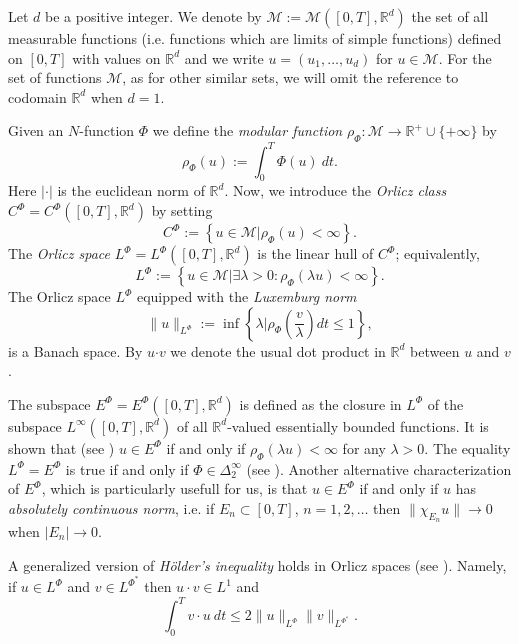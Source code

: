 \documentclass[twoside]{article}
\theoremstyle{remark}
\newcommand{\orlnor}{\|_{L^{\Phi}}}
\newcommand{\lphi}{L^{\Phi}}
\newcommand{\lpsi}{L^{\Phi^*}}
\newcommand{\ephi}{E^{\Phi}}
\newcommand{\claseor}{C^{\Phi}}
\renewcommand{\b}[1]{\boldsymbol{#1}}
\newcommand{\rr}{\mathbb{R}}
\renewcommand{\leq}{\leqslant}
\newcommand{\Phie}{\Phi^{*}}
\begin{document}
Let $d$ be a positive integer. We denote by $\mathcal{M}:=\mathcal{M}([0,T],\rr^d)$  the set of all measurable functions (i.e. functions which are limits of simple functions)  defined on $[0,T]$ with values on $\mathbb{R}^d$ and  we write $u=(u_1,\dots,u_d)$ for  $u\in \mathcal{M}$. For the set of functions $\mathcal{M}$, as for other similar sets, we will omit the reference to codomain $\mathbb{R}^d$ when $d=1$.


Given  an $N$-function $\Phi$ we define the \emph{modular function} 
$\rho_{\Phi}:\mathcal{M}\to \mathbb{R}^+\cup\{+\infty\}$ by
\[\rho_{\Phi}(u):= \int_0^T \Phi(u)\ dt.\]
Here $|\cdot|$ is the euclidean norm of $\mathbb{R}^d$.
Now, we introduce the \emph{Orlicz class} $C^{\Phi}=C^{\Phi}([0,T],\rr^d)$   by setting
\begin{equation}\label{claseOrlicz}
  C^{\Phi}:=\left\{u\in \mathcal{M} | \rho_{\Phi}(u)< \infty \right\}.
\end{equation}
The \emph{Orlicz space} $\lphi=L^{\Phi}([0,T],\rr^d)$ is the linear hull of $\claseor$;
equivalently,
\begin{equation}\label{espacioOrlicz}
\lphi:=\left\{ u\in \mathcal{M}| \exists \lambda>0: \rho_{\Phi}(\lambda u) < \infty   \right\}.
\end{equation}
  The Orlicz space $\lphi$ equipped with the \emph{Luxemburg norm}
\[
\|  u  \orlnor:=\inf \left\{ \lambda\bigg| \rho_{\Phi}\left(\frac{v}{\lambda}\right) dt\leq 1\right\},
\]
is a Banach space. By $u\b{\cdot} v$ we denote the usual dot product in $\mathbb{R}^{d}$ between $u$ and $v$.


The subspace $\ephi=\ephi([0,T],\rr^d)$ is defined as the closure in $\lphi$ of the subspace $L^{\infty}([0,T],\rr^d)$ of all $\mathbb{R}^d$-valued essentially bounded functions. It is shown that  (see \cite[Th. 5.1]{Orliczvectorial2005}) $u\in\ephi$  if and only if $\rho_{\Phi}(\lambda u)<\infty$ for any $\lambda>0$. The equality $\lphi=\ephi$ is true if and only if $\Phi\in\Delta_2^{\infty}$ (see \cite[Th. 5.2]{Orliczvectorial2005}). Another alternative characterization of $\ephi$, which is particularly usefull for us, is that $u\in\ephi$ if and only if $u$ has  \emph{absolutely continuous norm}, i.e.   if $E_n\subset [0,T]$, $n=1,2,\ldots$ then $\|\chi_{E_n}u\|\to 0$ when $|E_n|\to 0$.

A generalized version of \emph{H\"older's inequality} holds in Orlicz spaces (see \cite[Thm. 4.1]{Skaff1969}). Namely, if $u\in\lphi$ and $v\in\lpsi$ then $u\cdot v\in L^1$ and
\begin{equation}\label{holder}
\int_0^Tv\cdot u\ dt\leq 2 \|u\orlnor\|v\|_{L^{\Phie}}.
\end{equation}
\end{document}
